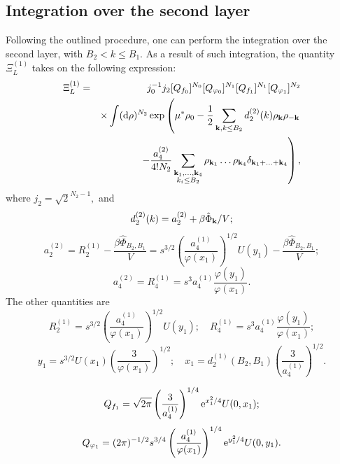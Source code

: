 \subsection{Integration over the second layer}
Following the outlined procedure, one can perform the integration over the second layer, with $B_2 < k \le B_1.$ As a result of such integration, the quantity $\Xi_L^{(1)}$ takes on the following expression:
\begin{eqnarray}
	\Xi_L^{(1)} & = & j_0^{-1}j_2 [Q_{f_0}]^{N_0} [Q_{\varphi_0}]^{N_1} [Q_{f_1}]^{N_1} [Q_{\varphi_1}]^{N_2} 
	\\
	&& \times 
	\int ({\rm d} \rho)^{N_2} \exp
	\left(
	\mu^*\rho_0 - \frac{1}{2} \sum_{\vb k, k \leq B_2} d_2^{(2)}(k) \rho_{\vb k} \rho_{-\vb k}
	\right.
	\nonumber \\
	&& 
	\left.
	- \frac{a_4^{(2)}}{4!N_2} \sum_{\substack{\vb k_1, \dotsc, \vb k_4 \\ k_i \leq B_2}}
	\rho_{\vb k_1} \dotsc \rho_{\vb k_4} \delta_{\vb{k}_1 + \dotsc + \vb{k}_4}
	\right)
	\nonumber ,
\end{eqnarray}
where $j_2 = \sqrt{2}^{N_2 - 1},$ and
\begin{equation}
	\label{RR_2_1_d}
	d_2^{(2)}(k) = a_2^{(2)} + \beta\hat{\Phi}_{\vb k} / V;
\end{equation}
\begin{equation}
	\label{RR_2_1_a2}
	a_2^{(2)} = R_2^{(1)} - \frac{\beta\hat{\Phi}_{B_2, B_1}}{V} = s^{3/2} \left(\frac{a_4^{(1)}}{\varphi(x_1)}\right)^{1/2} U(y_1)
	- \frac{\beta\hat{\Phi}_{B_2, B_1}}{V};
\end{equation}
\begin{equation}
	\label{RR_2_1_a4}
	a_4^{(2)} = R_4^{(1)} = s^3 a_4^{(1)} \frac{\varphi(y_1)}{\varphi(x_1)}.
\end{equation}
The other quantities are
\begin{equation*}
	R_2^{(1)} = s^{3/2} \left(\frac{a_4^{(1)}}{\varphi(x_1)}\right)^{1/2} U(y_1); 
	\quad 
	R_4^{(1)} = s^3 a_4^{(1)} \frac{\varphi(y_1)}{\varphi(x_1)};
\end{equation*}
\begin{equation*}
	y_1 = s^{3/2} U(x_1) \left(\frac{3}{\varphi(x_1)}\right)^{1/2};
	\quad
	x_1 = d_2^{(1)}(B_2, B_1) \left(\frac{3}{a_4^{(1)}}\right)^{1/2}.
\end{equation*}

\begin{equation*}
	Q_{f_1} = \sqrt{2\pi}\left(\frac{3}{a_4^{(1)}}\right)^{1/4} {\rm e}^{x_1^2/4} U(0,x_1);
\end{equation*}
\begin{equation*}
	Q_{\varphi_1} = (2\pi)^{-1/2} s^{3/4} \left(\frac{a_4^{(1)}}{\varphi(x_1)}\right)^{1/4} {\rm e}^{y_1^2/4} U(0,y_1).
\end{equation*}

